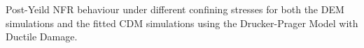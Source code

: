 \label{fig:fitted1} Post-Yeild NFR behaviour under different confining stresses for both the DEM simulations and the fitted CDM simulations using the Drucker-Prager Model with Ductile Damage.